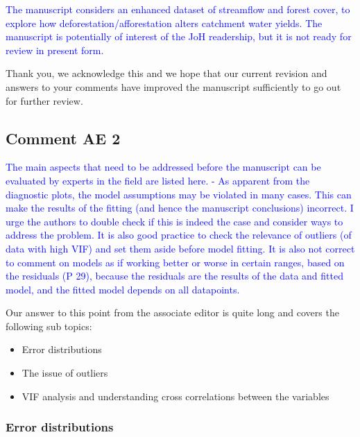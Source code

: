 \documentclass[]{elsarticle} %
\providecommand{\tightlist}{%
  \setlength{\itemsep}{0pt}\setlength{\parskip}{0pt}}
\begin{document}
\textcolor{blue}{The manuscript considers an enhanced dataset of streamflow and forest cover, to explore how deforestation/afforestation alters catchment water yields. The manuscript is potentially of interest of the JoH readership, but it is not ready for review in present form.}

Thank you, we acknowledge this and we hope that our current revision and answers to your comments have improved the manuscript sufficiently to go out for further review.

\hypertarget{comment-ae-2}{%
\subsection{Comment AE 2}\label{comment-ae-2}}

\textcolor{blue}{The main aspects that need to be addressed before the manuscript can be evaluated by experts in the field are listed here. 
- As apparent from the diagnostic plots, the model assumptions may be violated in many cases. This can make the results of the fitting (and hence the manuscript conclusions) incorrect. I urge the authors to double check if this is indeed the case and consider ways to address the problem. It is also good practice to check the relevance of outliers (of data with high VIF) and set them aside before model fitting. It is also not correct to comment on models as if working better or worse in certain ranges, based on the residuals (P 29), because the residuals are the results of the data and fitted model, and the fitted model depends on all datapoints.}

Our answer to this point from the associate editor is quite long and covers the following sub topics:

\begin{itemize}
\tightlist
\item
  Error distributions
\item
  The issue of outliers
\item
  VIF analysis and understanding cross correlations between the variables
\end{itemize}

\hypertarget{error-distributions}{%
\subsubsection{Error distributions}\label{error-distributions}}
\end{document}
